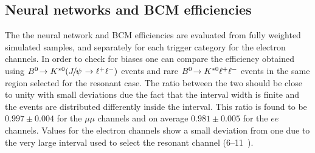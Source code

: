 \subsection{Neural networks and BCM efficiencies}
\label{sec:Rkst_mva_eff}

The the neural network and BCM efficiencies are evaluated from fully weighted simulated samples,
and separately for each trigger category for the electron channels.
%
In order to check for biases one can compare the efficiency obtained using
$\decay{\Bz}{\Kstarz(\jpsi\to\ll)}$ events and rare ${{B}^0}\!\rightarrow {\ensuremath{{K}^{*0}}} \ell^+ \ell^-$ events
in the same \qsq region selected for the resonant case. The ratio between the two should
be close to unity with small deviations due the fact that the \qsq interval width is finite and the events
are distributed differently inside the interval. This ratio is found to be $ 0.997  \pm  0.004 $ for the
$\mu\mu$ channels and on average $0.981  \pm  0.005$ for the $ee$ channels.
Values for the electron channels show a small deviation from one due to the very large
\qsq interval used to select the resonant channel (6--11~\gevgevcccc).











